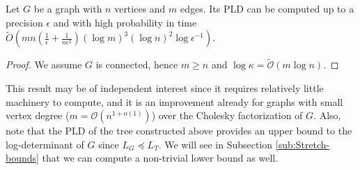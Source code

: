 \begin{theorem} \label{thm:PLD-tree}Let $G$ be a graph with $n$
vertices and $m$ edges. Its PLD can be computed up to a precision $\epsilon$ and with high probability in time $\tilde{O}\left(mn\left(\frac{1}{\epsilon}+\frac{1}{n\epsilon^{2}}\right)\left(\log m\right)^{3}\left(\log n\right)^{2}\log\epsilon^{-1}\right)$.\end{theorem}

\begin{proof} We assume $G$ is connected, hence $m\geq n$ and $\log\kappa=\tilde{\mathcal{O}}\left(m\log n\right)$.
\end{proof}

This result may be of independent interest since it requires relatively
little machinery to compute, and it is an improvement already for
graphs with small vertex degree ($m=\mathcal{O}\left(n^{1+o\left(1\right)}\right)$)
over the Cholesky factorization of $G$. Also, note that the PLD of
the tree constructed above provides an upper bound to the log-determinant
of $G$ since $L_{G}\preceq L_{T}$. We will see in Subsection \ref{sub:Stretch-bounds}
that we can compute a non-trivial lower bound as well.
